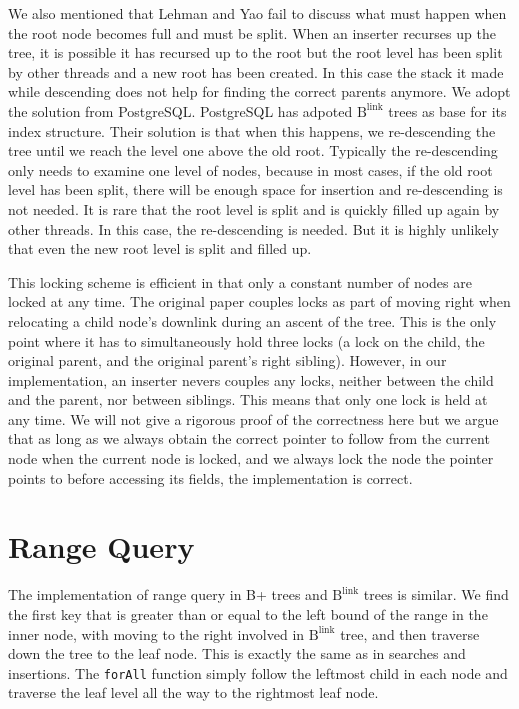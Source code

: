 \documentclass[11pt]{report}
\theoremstyle{definition}
\begin{document}
We also mentioned that Lehman and Yao fail to discuss what must happen when the root node becomes full and must be split. When an inserter recurses up the tree, it is possible it has recursed up to the root but the root level has been split by other threads and a new root has been created. In this case the stack it made while descending does not help for finding the correct parents anymore. We adopt the solution from PostgreSQL. PostgreSQL has adpoted $\text{B}^{\text{link}}$ trees as base for its index structure. Their solution is that when this happens, we re-descending the tree until we reach the level one above the old root. Typically the re-descending only needs to examine one level of nodes, because in most cases, if the old root level has been split, there will be enough space for insertion and re-descending is not needed. It is rare that the root level is split and is quickly filled up again by other threads. In this case, the re-descending is needed. But it is highly unlikely that even the new root level is split and filled up.

This locking scheme is efficient in that only a constant number of nodes are locked at any time. The original paper couples locks as part of moving right when relocating a child node's downlink during an ascent of the tree.  This is the only point where it has to simultaneously hold three locks (a lock on the child, the original parent, and the original parent's right sibling). However, in our implementation, an inserter nevers couples any locks, neither between the child and the parent, nor between siblings. This means that only one lock is held at any time. We will not give a rigorous proof of the correctness here but we argue that as long as we always obtain the correct pointer to follow from the current node when the current node is locked, and we always lock the node the pointer points to before accessing its fields, the implementation is correct.

\section{Range Query}
\label{sec:range-query}

The implementation of range query in B+ trees and $\text{B}^{\text{link}}$ trees is similar. We find the first key that is greater than or equal to the left bound of the range in the inner node, with moving to the right involved in $\text{B}^{\text{link}}$ tree, and then traverse down the tree to the leaf node. This is exactly the same as in searches and insertions. The \texttt{forAll} function simply follow the leftmost child in each node and traverse the leaf level all the way to the rightmost leaf node.
\end{document}
